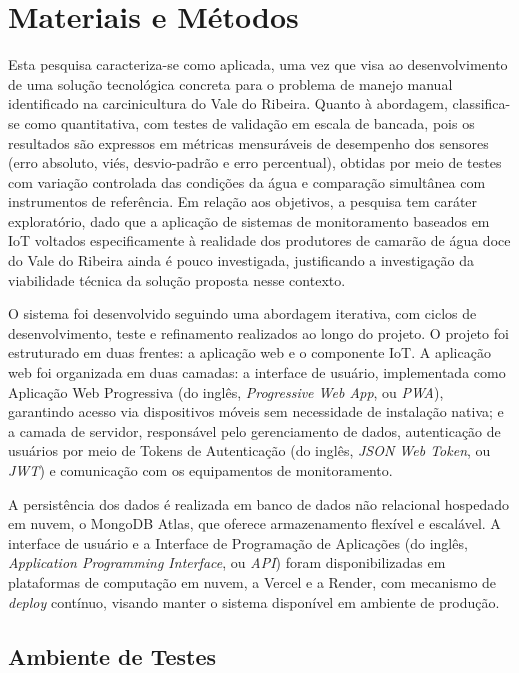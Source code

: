 \documentclass[11pt,a4paper]{article}
\begin{document}
\section{Materiais e Métodos}

Esta pesquisa caracteriza-se como aplicada, uma vez que visa ao desenvolvimento de uma solução tecnológica concreta para o problema de manejo manual identificado na carcinicultura do Vale do Ribeira. Quanto à abordagem, classifica-se como quantitativa, com testes de validação em escala de bancada, pois os resultados são expressos em métricas mensuráveis de desempenho dos sensores (erro absoluto, viés, desvio-padrão e erro percentual), obtidas por meio de testes com variação controlada das condições da água e comparação simultânea com instrumentos de referência. Em relação aos objetivos, a pesquisa tem caráter exploratório, dado que a aplicação de sistemas de monitoramento baseados em IoT voltados especificamente à realidade dos produtores de camarão de água doce do Vale do Ribeira ainda é pouco investigada, justificando a investigação da viabilidade técnica da solução proposta nesse contexto.

O sistema foi desenvolvido seguindo uma abordagem iterativa, com ciclos de desenvolvimento, teste e refinamento realizados ao longo do projeto. O projeto foi estruturado em duas frentes: a aplicação web e o componente IoT. A aplicação web foi organizada em duas camadas: a interface de usuário, implementada como Aplicação Web Progressiva (do inglês, \textit{Progressive Web App}, ou \textit{PWA}), garantindo acesso via dispositivos móveis sem necessidade de instalação nativa; e a camada de servidor, responsável pelo gerenciamento de dados, autenticação de usuários por meio de Tokens de Autenticação (do inglês, \textit{JSON Web Token}, ou \textit{JWT}) e comunicação com os equipamentos de monitoramento.

A persistência dos dados é realizada em banco de dados não relacional hospedado em nuvem, o MongoDB Atlas, que oferece armazenamento flexível e escalável. A interface de usuário e a Interface de Programação de Aplicações (do inglês, \textit{Application Programming Interface}, ou \textit{API}) foram disponibilizadas em plataformas de computação em nuvem, a Vercel e a Render, com mecanismo de \textit{deploy} contínuo, visando manter o sistema disponível em ambiente de produção.

\subsection{Ambiente de Testes}
 
\end{document}
